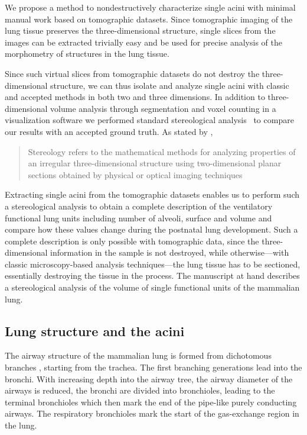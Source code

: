 \documentclass[twoside,paper=a4,abstract=true,english,DIV=calc]{scrartcl}
\begin{document}
We propose a method to nondestructively characterize single acini with minimal manual work based on tomographic datasets. Since tomographic imaging of the lung tissue preserves the three-dimensional structure, single slices from the images can be extracted trivially easy and be used for precise analysis of the morphometry of structures in the lung tissue.

Since such virtual slices from tomographic datasets do not destroy the three-dimensional structure, we can thus isolate and analyze single acini with classic and accepted methods in both two and three dimensions. In addition to three-dimensional volume analysis through segmentation and voxel counting in a visualization software we performed standard stereological analysis~\cite{Hsia2010} to compare our results with an accepted ground truth. As stated by \citet{Hsia2010}, \blockquote{Stereology refers to the mathematical methods for analyzing properties of an irregular three-dimensional structure using two-dimensional planar sections obtained by physical or optical imaging techniques}.

Extracting single acini from the tomographic datasets enables us to perform such a stereological analysis to obtain a complete description of the ventilatory functional lung units including number of alveoli, surface and volume and compare how these values change during the postnatal lung development. Such a complete description is only possible with tomographic data, since the three-dimensional information in the sample is not destroyed, while otherwise---with classic microscopy-based analysis techniques---the lung tissue has to be sectioned, essentially destroying the tissue in the process. The manuscript at hand describes a stereological analysis of the volume of single functional units of the mammalian lung.

\subsection{Lung structure and the acini}
The airway structure of the mammalian lung is formed from dichotomous branches \cite{Weibel1991}, starting from the trachea. The first branching generations lead into the bronchi. With increasing depth into the airway tree, the airway diameter of the airways is reduced, the bronchi are divided into bronchioles, leading to the terminal bronchioles which then mark the end of the pipe-like purely conducting airways. The respiratory bronchioles mark the start of the gas-exchange region in the lung.
\end{document}
